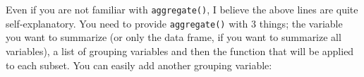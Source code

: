 \documentclass[
]{article}
\newenvironment{Shaded}{\begin{snugshade}}{\end{snugshade}}
\newcommand{\DataTypeTok}[1]{\textcolor[rgb]{0.13,0.29,0.53}{#1}}
\newcommand{\KeywordTok}[1]{\textcolor[rgb]{0.13,0.29,0.53}{\textbf{#1}}}
\newcommand{\NormalTok}[1]{#1}
\newcommand{\OperatorTok}[1]{\textcolor[rgb]{0.81,0.36,0.00}{\textbf{#1}}}
\begin{document}
Even if you are not familiar with \texttt{aggregate()}, I believe the above lines are quite self-explanatory.
You need to provide \texttt{aggregate()} with 3 things; the variable you want to summarize (or only the
data frame, if you want to summarize all variables), a list of grouping variables and then the
function that will be applied to each subset. You can easily add another grouping variable:

\begin{Shaded}
\end{Shaded}
\end{document}

